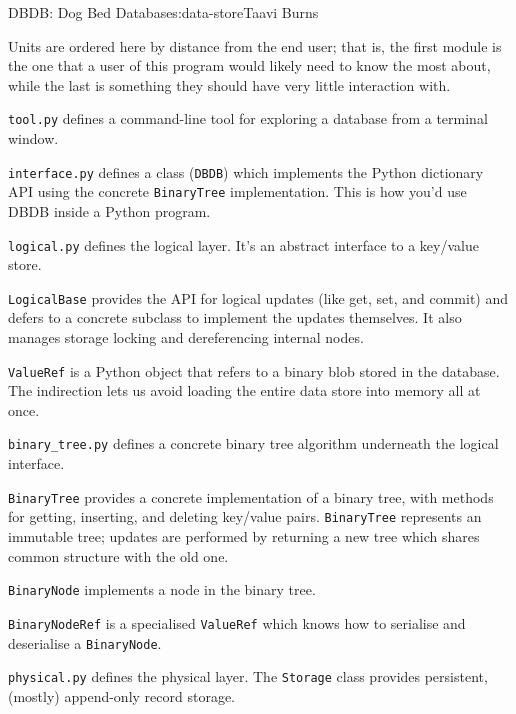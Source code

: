 \begin{aosachapter}{DBDB: Dog Bed Database}{s:data-store}{Taavi Burns}
\label{organisational-units}

Units are ordered here by distance from the end user; that is, the first
module is the one that a user of this program would likely need to know
the most about, while the last is something they should have very little
interaction with.

\begin{aosaitemize}
\item
  \texttt{tool.py} defines a command-line tool for exploring a database
  from a terminal window.
\item
  \texttt{interface.py} defines a class (\texttt{DBDB}) which implements
  the Python dictionary API using the concrete \texttt{BinaryTree}
  implementation. This is how you'd use DBDB inside a Python program.
\item
  \texttt{logical.py} defines the logical layer. It's an abstract
  interface to a key/value store.

  \begin{aosaitemize}
  \item
    \texttt{LogicalBase} provides the API for logical updates (like get,
    set, and commit) and defers to a concrete subclass to implement the
    updates themselves. It also manages storage locking and
    dereferencing internal nodes.
  \item
    \texttt{ValueRef} is a Python object that refers to a binary blob
    stored in the database. The indirection lets us avoid loading the
    entire data store into memory all at once.
  \end{aosaitemize}
\item
  \texttt{binary\_tree.py} defines a concrete binary tree algorithm
  underneath the logical interface.

  \begin{aosaitemize}
  \item
    \texttt{BinaryTree} provides a concrete implementation of a binary
    tree, with methods for getting, inserting, and deleting key/value
    pairs. \texttt{BinaryTree} represents an immutable tree; updates are
    performed by returning a new tree which shares common structure with
    the old one.
  \item
    \texttt{BinaryNode} implements a node in the binary tree.
  \item
    \texttt{BinaryNodeRef} is a specialised \texttt{ValueRef} which
    knows how to serialise and deserialise a \texttt{BinaryNode}.
  \end{aosaitemize}
\item
  \texttt{physical.py} defines the physical layer. The \texttt{Storage}
  class provides persistent, (mostly) append-only record storage.
\end{aosaitemize}


\end{aosachapter}
